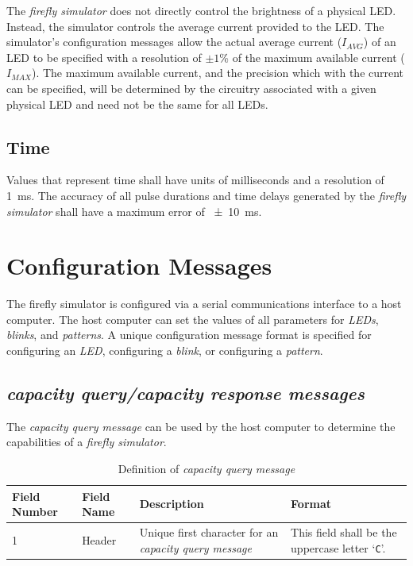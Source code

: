 \documentclass[letterpaper,11pt]{article}
\begin{document}
The \textit{firefly simulator} does not directly control the brightness of a
physical LED. Instead, the simulator controls the average current provided to
the LED. The simulator's configuration messages allow the actual average
current ($I_{AVG}$) of an LED to be specified with a resolution of $\pm 1$\% of
the maximum available current ($I_{MAX}$). The maximum available current, and
the precision which with the current can be specified, will be
determined by the circuitry associated with a given physical LED and need not be
the same for all LEDs.

\subsection{Time}

Values that represent time shall have units of milliseconds and a resolution
of \SI{1}{\milli\second}. The accuracy of all pulse durations and time delays
generated by the \textit{firefly simulator} shall have a maximum error of
\SI{\pm 10}{\milli\second}.

\newpage
\section{Configuration Messages}

The firefly simulator is configured via a serial communications interface to
a host computer. The host computer can set the values of all parameters for
\textit{LEDs}, \textit{blinks}, and \textit{patterns}. A unique configuration
message format is specified for configuring an \textit{LED}, configuring a
\textit{blink}, or configuring a \textit{pattern}.

\subsection{\textit{capacity query/capacity response messages}}

The \textit{capacity query message} can be used by the host computer to
determine the capabilities of a \textit{firefly simulator}.

\begin{table}[H]
  \caption{Definition of \textit{capacity query message}}
  \centering
  \setlength\extrarowheight{2pt}
  \begin{tabular}[h]{|p{0.5in}|p{1.00in}|p{2.25in}|p{2.25in}|} \hline
    Field Number & Field Name & Description & Format \\ \hline
    1            & Header
    & Unique first character for an \textit{capacity query message}
    & This field shall be the uppercase letter `\texttt{C}'.
    \\ \hline
  \end{tabular}
  \label{tab:CapacityQuery}
\end{table}
\end{document}

